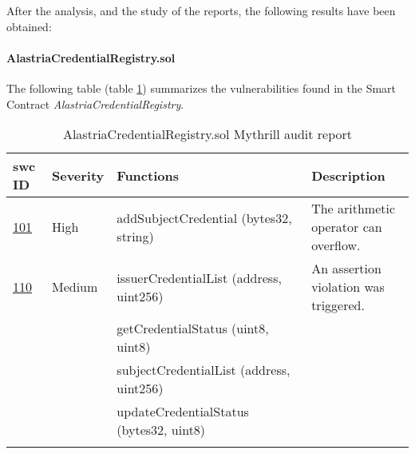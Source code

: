 

After the analysis, and the study of the reports, the following results have been obtained:
\paragraph{AlastriaCredentialRegistry.sol}
The following table (table \ref{tab:AlastriaCredentialRegistry}) summarizes the vulnerabilities found in the Smart Contract \textit{AlastriaCredentialRegistry}.
\begin{longtable}{||p{0.1\linewidth} | p{0.11\linewidth} | p{0.52\linewidth} | p{0.3\linewidth}||}
    \hline
    \textbf{\acrshort{swc} ID}                      & \textbf{Severity} & \textbf{Functions}                       & \textbf{Description}                  \\ [0.5ex]
    \hline\hline
    \href{https://swcregistry.io/docs/SWC-101}{101} & High              & addSubjectCredential (bytes32, string)   & The arithmetic operator can overflow. \\
    \hline
    \href{https://swcregistry.io/docs/SWC-110}{110} & Medium            & issuerCredentialList (address, uint256)  & An assertion violation was triggered. \\
    \cline{3-3}
                                                    &                   & getCredentialStatus (uint8, uint8)       &                                       \\
    \cline{3-3}
                                                    &                   & subjectCredentialList (address, uint256) &                                       \\
    \cline{3-3}
                                                    &                   & updateCredentialStatus (bytes32, uint8)  &                                       \\ [1ex]
    \hline
    \caption{AlastriaCredentialRegistry.sol Mythrill audit report}
    \label{tab:AlastriaCredentialRegistry}
\end{longtable}

\newpage

